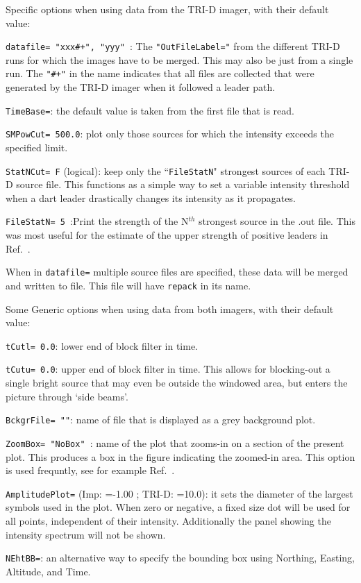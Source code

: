 Specific options when using data from the TRI-D imager, with their default value:
\begin{enumerate*}
\item \verb!datafile= "xxx#+", "yyy" !: The \verb!"OutFileLabel="! from the different TRI-D runs for which the images have to be merged. This may also be just from a single run. The \verb!"#+"! in the name indicates that all files are collected that were generated by the TRI-D imager when it followed a leader path.
\item \verb!TimeBase=!: the default value is taken from the first file that is read.
\item \verb!SMPowCut= 500.0!: plot only those sources for which the intensity exceeds the specified limit.
\item \verb!StatNCut= F! (logical): keep only the ``\verb!FileStatN!" strongest sources of each TRI-D source file. This functions as a simple way to set a variable intensity threshold when a dart leader drastically changes its intensity as it propagates.
\item \verb!FileStatN= 5 !:Print the strength of the N$^{th}$ strongest source in the .out file. This was most useful for the estimate of the upper strength of positive leaders in Ref.~\cite{Scholten:2023PL}.
\end{enumerate*}
When in \verb!datafile=! multiple source files are specified, these data will be merged and written to file. This file will have \verb!repack! in its name.


Some Generic options when using data from both imagers, with their default value:
\begin{enumerate*}
\item \verb!tCutl= 0.0!: lower end of block filter in time.
\item \verb!tCutu= 0.0!: upper end of block filter in time. This allows for blocking-out a single bright source that may even be outside the windowed area, but enters the picture through `side beams'.
\item \verb!BckgrFile= ""!: name of file that is displayed as a grey background plot.
\item \verb!ZoomBox= "NoBox" !:  name of the plot that zooms-in on a section of the present plot. This produces a box in the figure indicating the zoomed-in area. This option is used frequntly, see for example Ref.~\cite{Scholten:2021-HANL}.
\item \verb!AmplitudePlot=!  (Imp: =-1.00 ; TRI-D: =10.0): it sets the diameter of the largest symbols used in the plot. When zero or negative, a fixed size dot will be used for all points, independent of their intensity. Additionally the panel showing the intensity spectrum will not be shown.
\item \verb!NEhtBB=!: an alternative way to specify the bounding box using Northing, Easting, Altitude, and Time.
\end{enumerate*}


